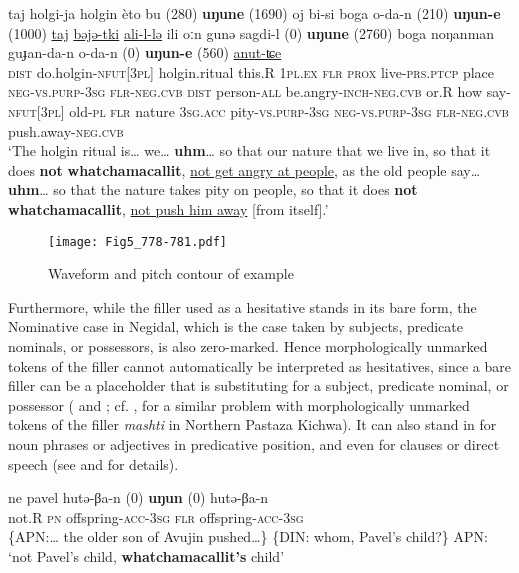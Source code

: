 \documentclass[output=paper]{langscibook}
\begin{document}
\ea \label{ex:pakendorf:8}
\gll taj
	holgi-ja
	holgin
	èto
	bu
	\textup{(280)}
	\textbf{uŋune}
	\textup{(1690)}
	oj
	bi-si
	boga
	o-da-n
	\textup{(210)}
	\textbf{uŋun-e}
	\textup{(1000)}
	\uline{taj}
	\uline{bəjə-tki}
	\uline{ali-l-lə}
	ili
	oːn
	gunə
	sagdi-l
	\textup{(0)}
	\textbf{uŋune}
	\textup{(2760)}
	boga
	noŋanman
	guɟan-da-n
	o-da-n
	\textup{(0)}
	\textbf{uŋun-e}
	\textup{(560)}
	\uline{anut-ʨe}\\
	\textsc{dist}
	do.holgin-\textsc{nfut[3pl]}
	holgin.ritual
	this.R
	\textsc{1pl.ex}
	{}
	\textsc{flr}
	{}
	\textsc{prox}
	live-\textsc{prs.ptcp}
	place
	\textsc{neg-vs.purp-3sg}
	{}
	\textsc{flr-neg.cvb}
	{}
	\textsc{dist}
	person-\textsc{all}
	be.angry-\textsc{inch-neg.cvb}
	or.R
	how
	say-\textsc{nfut[3pl]}
	old-\textsc{pl}
	{}
	\textsc{flr}
	{}
	nature
	\textsc{3sg.acc}
	pity-\textsc{vs.purp-3sg}
	\textsc{neg}-\textsc{vs.purp-3sg}
	{}
	\textsc{flr-neg.cvb}
	{}
	push.away-\textsc{neg.cvb}\\
\glt ‘The holgin ritual is… we… \textbf{uhm}… so that our nature that we live in, so that it does \textbf{not} \textbf{whatchamacallit}, \uline{not get angry at people}, as the old people say… \textbf{uhm}… so that the nature takes pity on people, so that it does \textbf{not} \textbf{whatchamacallit}, \uline{not push him away} [from itself].’ 
\z


\begin{figure}
\texttt{[image: Fig5\_778-781.pdf]}
\caption{Waveform and pitch contour of example }
\label{fig:pakendorf:5}
\end{figure}

Furthermore, while the filler used as a hesitative stands in its bare form, the Nominative case in Negidal, which is the case taken by subjects, predicate nominals, or possessors, is also zero-marked. Hence morphologically unmarked tokens of the filler cannot automatically be interpreted as hesitatives, since a bare filler can be a placeholder that is substituting for a subject, predicate nominal, or possessor ( and ; cf. \cite{chapters/rice}, for a similar problem with morphologically unmarked tokens of the filler \textit{mashti} in Northern Pastaza Kichwa). It can also stand in for noun phrases or adjectives in predicative position, and even for clauses or direct speech (see  and  for details). 


\ea \label{ex:pakendorf:9}
\gll ne
	pavel
	hutə-βa-n
	\textup{(0)}
	\textbf{uŋun}
	\textup{(0)}
	hutə-βa-n\\
	not.\textsc{R}
	\textsc{pn}
	offspring-\textsc{acc-3sg}
	{}
	\textsc{flr}
	{}
	offspring-\textsc{acc-3sg}\\
\glt \{APN:… the older son of Avujin pushed…\} \{DIN: whom, Pavel’s child?\} APN: ‘not Pavel’s child, \textbf{whatchamacallit’s} child’ 
\z
\end{document}
